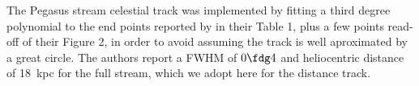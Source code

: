 The Pegasus stream celestial track was implemented by fitting a third degree polynomial to the end points reported 
by \citet{Perottoni2019} in their Table 1, plus a few points read-off of their Figure 2, in order to avoid assuming the track is well aproximated by a great circle. The authors report a FWHM of $0\fdg4$ and heliocentric distance of 18~kpc for the full stream, which we adopt here for the distance track. 
